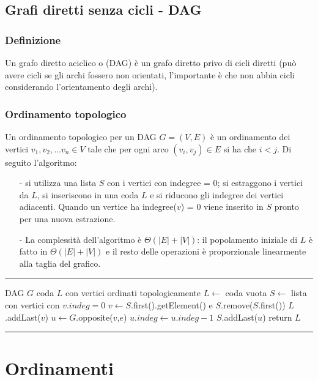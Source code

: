 \documentclass[a4paper]{article}
\makeatletter
\newenvironment{algo}[4]{
	\noindent\rule{\textwidth}{0.4pt}
	\begin{algorithmic}[1]
		\addtocounter{ALG@line}{-1}
		\Procedure{#1}{#2}
		\Require #3
		\Ensure #4
		\Statex }{
		\EndProcedure
	\end{algorithmic}
	\rule{\textwidth}{0.4pt}}
\makeatother
\begin{document}
\newpage

\subsection{Grafi diretti senza cicli - DAG}
\subsubsection*{Definizione}
Un grafo diretto aciclico o (DAG) è un grafo diretto privo di cicli diretti (può avere cicli se gli archi fossero non orientati,
l'importante è che non abbia cicli considerando l'orientamento degli archi).

\subsubsection*{Ordinamento topologico}
Un ordinamento topologico per un DAG \(G = (V,E)\) è un ordinamento dei vertici \(v_1, v_2, \dots v_n \in V\) tale che per ogni
arco \((v_i, v_j) \in E\) si ha che \(i < j\). Di seguito l'algoritmo:

\begin{itemize}[topsep=3pt, itemsep=0pt]
	\item[-] si utilizza una lista \(S\) con i vertici con indegree = 0; si estraggono i vertici da \(L\), si inseriscono in
	una coda \(L\) e si riducono gli indegree dei vertici adiacenti. Quando un vertice ha indegree(\(v\)) = 0 viene inserito
	in \(S\) pronto per una nuova estrazione.
	\item[-] La complessità dell'algoritmo è \(\Theta(|E|+|V|)\): il popolamento iniziale di \(L\) è fatto in \(\Theta(|E|+|V|)\)
	e il resto delle operazioni è proporzionale linearmente alla taglia del grafico.
\end{itemize}
\begin{algo}{TopologicalSort}{$G$}{DAG $G$}{coda \(L\) con vertici ordinati topologicamente}
	\State \(L \gets\) coda vuota
	\State \(S \gets\) lista con vertici con \(v.indeg = 0\)
		\State \(v \gets S\).first().getElement() e \(S\).remove(\(S\).first())
		\State \(L\).addLast(\(v\))
			\State \(u \gets G\).opposite(\(v\),\(e\))
			\State \(u.indeg \gets u.indeg - 1\)
			 \(S\).addLast(\(u\))
			\EndIf
		\EndFor
	\EndWhile
	\State return \(L\)
\end{algo}

\newpage


\section{Ordinamenti}
\end{document}
